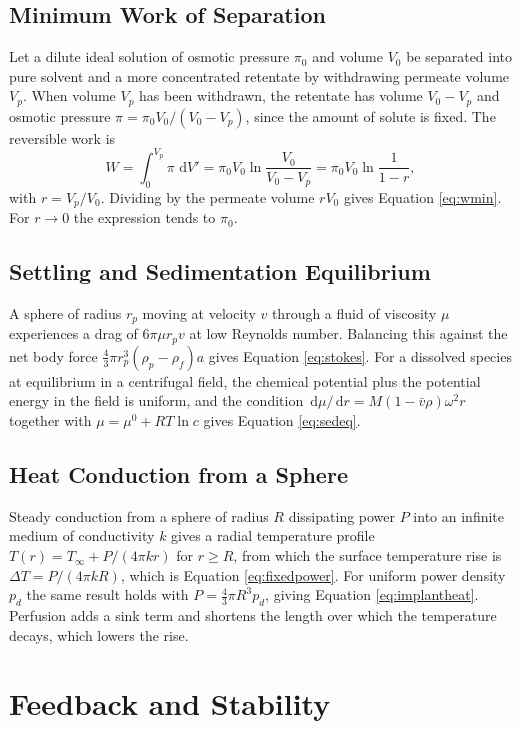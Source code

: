 \documentclass[11pt,openany]{book}
\theoremstyle{definition}
\theoremstyle{remark}
\newcommand{\dd}{\,\mathrm{d}}
\begin{document}
\section{Minimum Work of Separation}

Let a dilute ideal solution of osmotic pressure $\pi_0$ and volume $V_0$ be separated into pure solvent and a more concentrated retentate by withdrawing permeate volume $V_p$. When volume $V_p$ has been withdrawn, the retentate has volume $V_0-V_p$ and osmotic pressure $\pi=\pi_0V_0/(V_0-V_p)$, since the amount of solute is fixed. The reversible work is
\[
W=\int_0^{V_p}\pi\,\dd V'=\pi_0V_0\ln\frac{V_0}{V_0-V_p}=\pi_0V_0\ln\frac{1}{1-r},
\]
with $r=V_p/V_0$. Dividing by the permeate volume $rV_0$ gives Equation \eqref{eq:wmin}. For $r\to0$ the expression tends to $\pi_0$.

\section{Settling and Sedimentation Equilibrium}

A sphere of radius $r_p$ moving at velocity $v$ through a fluid of viscosity $\mu$ experiences a drag of $6\pi\mu r_pv$ at low Reynolds number. Balancing this against the net body force $\tfrac{4}{3}\pi r_p^{3}(\rho_p-\rho_f)a$ gives Equation \eqref{eq:stokes}. For a dissolved species at equilibrium in a centrifugal field, the chemical potential plus the potential energy in the field is uniform, and the condition $\dd\mu/\dd r=M(1-\bar v\rho)\omega^{2}r$ together with $\mu=\mu^{0}+RT\ln c$ gives Equation \eqref{eq:sedeq}.

\section{Heat Conduction from a Sphere}

Steady conduction from a sphere of radius $R$ dissipating power $P$ into an infinite medium of conductivity $k$ gives a radial temperature profile $T(r)=T_\infty+P/(4\pi kr)$ for $r\ge R$, from which the surface temperature rise is $\Delta T=P/(4\pi kR)$, which is Equation \eqref{eq:fixedpower}. For uniform power density $p_d$ the same result holds with $P=\tfrac{4}{3}\pi R^{3}p_d$, giving Equation \eqref{eq:implantheat}. Perfusion adds a sink term and shortens the length over which the temperature decays, which lowers the rise.

\chapter{Feedback and Stability}
\label{app:feedback}
\end{document}
